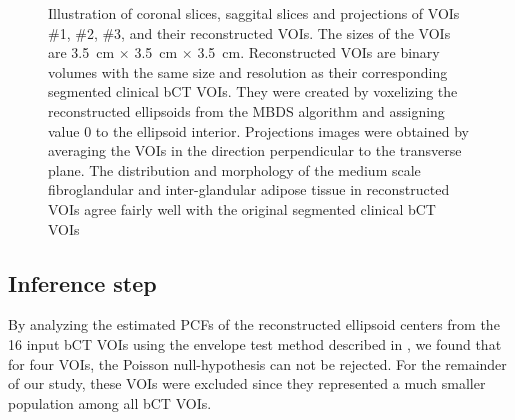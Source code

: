 \documentclass[journal]{IEEEtran}
\begin{document}
\begin{figure}[!htb]

  \caption{Illustration of coronal slices, saggital slices and
    projections of VOIs \#1, \#2, \#3, and their reconstructed
    VOIs. The sizes of the VOIs are \SI{3.5}{\cm} $\times$
    \SI{3.5}{\cm} $\times$ \SI{3.5}{\cm}. Reconstructed VOIs are
    binary volumes with the same size and resolution as their
    corresponding segmented clinical bCT VOIs. They were created by
    voxelizing the reconstructed ellipsoids from the MBDS algorithm
    and assigning value 0 to the ellipsoid interior. Projections
    images were obtained by averaging the VOIs in the direction
    perpendicular to the transverse plane. The distribution and
    morphology of the medium scale fibroglandular and inter-glandular
    adipose tissue in reconstructed VOIs agree fairly well with the
    original segmented clinical bCT VOIs}
  \label{fig:bct-datasets-recon}

\end{figure}

\subsection{Inference step}
\label{sec:inference-step}

By analyzing the estimated PCFs of the reconstructed ellipsoid centers
from the 16 input bCT VOIs using the envelope test method described in
\cite{baddeley2014tests}, we found that for four VOIs, the Poisson
null-hypothesis can not be rejected. For the remainder of our study,
these VOIs were excluded since they represented a much smaller
population among all bCT VOIs.
\end{document}
